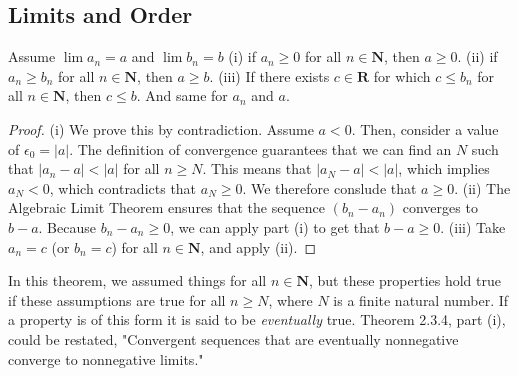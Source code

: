     \subsection*{Limits and Order}
        \begin{theorem}
            Assume $\lim a_n = a$ and $\lim b_n = b$
            \newline
            (i) if $a_n \geq 0$ for all $n \in \textbf{N}$, then $a \geq 0$.
            \newline
            (ii) if $a_n \geq b_n$ for all $n \in \textbf{N}$, then $a \geq b$.
            \newline
            (iii) If there exists $c \in \textbf{R}$ for which $c \leq b_n$ for all $n \in \textbf{N}$, then $c \leq b$. And same for $a_n$ and $a$.
        \end{theorem}
        \begin{proof}
            (i) We prove this by contradiction. Assume $a < 0$. Then, consider a value of $\epsilon_0 = |a|$. The definition of convergence guarantees that we can find an $N$ such that $|a_n - a| < |a|$ for all $n \geq N$. This means that $|a_N - a| < |a|$, which implies $a_N < 0$, which contradicts that $a_N \geq 0$. We therefore conslude that $a \geq 0$.
            \newline
            (ii) The Algebraic Limit Theorem ensures that the sequence $(b_n - a_n)$ converges to $b - a$. Because $b_n - a_n \geq 0$, we can apply part (i) to get that $b - a \geq 0$.
            \newline
            (iii) Take $a_n = c$ (or $b_n = c$) for all $n \in \textbf{N}$, and apply (ii).
        \end{proof}
        In this theorem, we assumed things for all $n \in \textbf{N}$, but these properties hold true if these assumptions are true for all $n \geq N$, where $N$ is a finite natural number. If a property is of this form it is said to be \textit{eventually} true. Theorem 2.3.4, part (i), could be restated, "Convergent sequences that are eventually nonnegative converge to nonnegative limits."